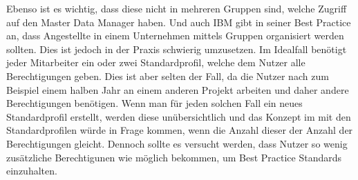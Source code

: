 Ebenso ist es wichtig, dass diese nicht in mehreren Gruppen sind, welche Zugriff auf den Master Data Manager haben.
Und auch IBM gibt in seiner Best Practice an, dass Angestellte in einem Unternehmen mittels Gruppen organisiert werden sollten. \cite{IBMGroup}
\newline
Dies ist jedoch in der Praxis schwierig umzusetzen.
Im Idealfall benötigt jeder Mitarbeiter ein oder zwei Standardprofil, welche dem Nutzer alle Berechtigungen geben.
Dies ist aber selten der Fall, da die Nutzer nach zum Beispiel einem halben Jahr an einem anderen Projekt arbeiten und daher andere Berechtigungen benötigen.
Wenn man für jeden solchen Fall ein neues Standardprofil erstellt, werden diese unübersichtlich und das Konzept im mit den Standardprofilen würde in Frage kommen, wenn die Anzahl dieser der Anzahl der Berechtigungen gleicht.
Dennoch sollte es versucht werden, dass Nutzer so wenig zusätzliche Berechtigunen wie möglich bekommen, um Best Practice Standards einzuhalten. 

